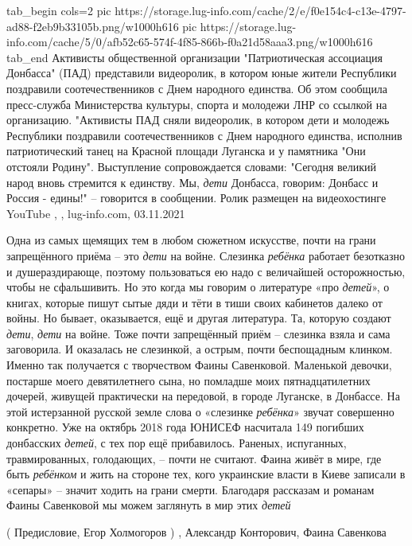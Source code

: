 \ifcmt
  tab_begin cols=2
     pic https://storage.lug-info.com/cache/2/e/f0e154c4-c13e-4797-ad88-f2eb9b33105b.png/w1000h616%
     pic https://storage.lug-info.com/cache/5/0/afb52c65-574f-4f85-866b-f0a21d58aaa3.png/w1000h616%
  tab_end
\fi
Активисты общественной организации "Патриотическая ассоциация Донбасса" (ПАД)
представили видеоролик, в котором юные жители Республики поздравили
соотечественников с Днем народного единства. Об этом сообщила пресс-служба
Министерства культуры, спорта и молодежи ЛНР со ссылкой на организацию.
"Активисты ПАД сняли видеоролик, в котором дети и молодежь Республики
поздравили соотечественников с Днем народного единства, исполнив патриотический
танец на Красной площади Луганска и у памятника "Они отстояли Родину".
Выступление сопровождается словами: "Сегодня великий народ вновь стремится к
единству. Мы, \emph{дети} Донбасса, говорим: Донбасс и Россия - едины!" – говорится в
сообщении.  Ролик размещен на видеохостинге YouTube
, 
, lug-info.com, 03.11.2021

Одна из самых щемящих тем в любом сюжетном искусстве, почти на грани
запрещённого приёма – это \emph{дети} на войне. Слезинка \emph{ребёнка} работает безотказно и
душераздирающе, поэтому пользоваться ею надо с величайшей осторожностью, чтобы
не сфальшивить. Но это когда мы говорим о литературе «про\emph{ детей}», о книгах,
которые пишут сытые дяди и тёти в тиши своих кабинетов далеко от войны.  Но
бывает, оказывается, ещё и другая литература. Та, которую создают \emph{дети}, \emph{дети} на
войне. Тоже почти запрещённый приём – слезинка взяла и сама заговорила. И
оказалась не слезинкой, а острым, почти беспощадным клинком.  Именно так
получается с творчеством Фаины Савенковой. Маленькой девочки, постарше моего
девятилетнего сына, но помладше моих пятнадцатилетних дочерей, живущей
практически на передовой, в городе Луганске, в Донбассе.  На этой истерзанной
русской земле слова о «слезинке \emph{ребёнка}» звучат совершенно конкретно. Уже на
октябрь 2018 года ЮНИСЕФ насчитала 149 погибших донбасских \emph{детей}, с тех пор ещё
прибавилось. Раненых, испуганных, травмированных, голодающих, – почти не
считают. Фаина живёт в мире, где быть \emph{ребёнком} и жить на стороне тех, кого
украинские власти в Киеве записали в «сепары» – значит ходить на грани смерти.
Благодаря рассказам и романам Фаины Савенковой мы можем заглянуть в мир этих
\emph{детей}\par
( Предисловие, Егор Холмогоров )
, Александр Конторович, Фаина Савенкова

